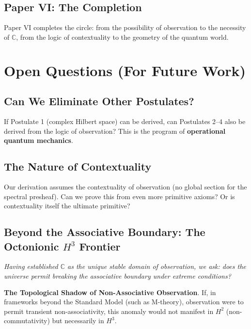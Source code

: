 \documentclass[11pt]{article}
\begin{document}
\subsection{Paper VI: The Completion}
\label{paper-vi-completion}

Paper VI completes the circle: from the possibility of observation to the necessity of $\mathbb{C}$, from the logic of contextuality to the geometry of the quantum world.

\section{Open Questions (For Future Work)}
\label{open-questions}

\subsection{Can We Eliminate Other Postulates?}
\label{eliminate-other-postulates}

If Postulate 1 (complex Hilbert space) can be derived, can Postulates 2--4 also be derived from the logic of observation? This is the program of \textbf{operational quantum mechanics}.

\subsection{The Nature of Contextuality}
\label{nature-of-contextuality}

Our derivation assumes the contextuality of observation (no global section for the spectral presheaf). Can we prove this from even more primitive axioms? Or is contextuality itself the ultimate primitive?

\subsection{Beyond the Associative Boundary: The Octonionic $H^3$ Frontier}
\label{octonionic-h3}

\textit{Having established $\mathbb{C}$ as the unique stable domain of observation, we ask: does the universe permit breaking the associative boundary under extreme conditions?}

\textbf{The Topological Shadow of Non-Associative Observation}.
If, in frameworks beyond the Standard Model (such as M-theory), observation were to permit transient non-associativity, this anomaly would not manifest in $H^2$ (non-commutativity) but necessarily in \textbf{$H^3$}.
\end{document}
